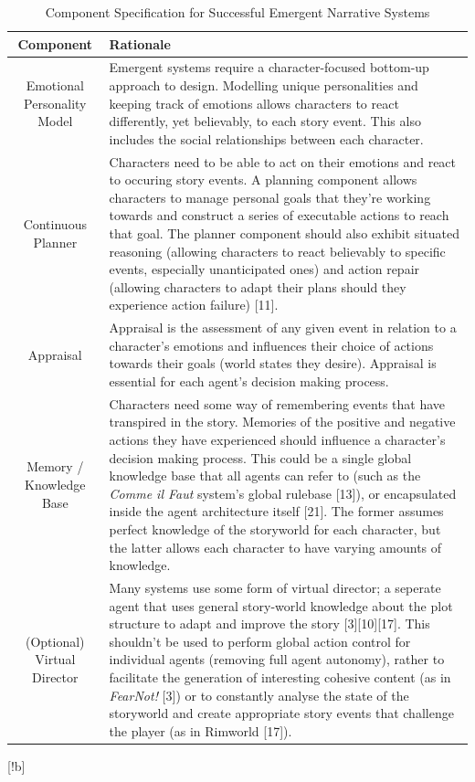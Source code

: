 \documentclass{sig-alternate-05-2015}
\begin{document}
\begin{table}[!b]
\centering
\caption{Component Specification for Successful Emergent Narrative Systems}
    \begin{tabular}{| c | p{13cm} |}
    \hline
    \textbf{Component} & \textbf{Rationale} \\ \hline
    Emotional Personality Model & Emergent systems require a character-focused bottom-up approach to design. Modelling unique personalities and keeping track of emotions allows characters to react differently, yet believably, to each story event. This also includes the social relationships between each character. \\ \hline
    Continuous Planner & Characters need to be able to act on their emotions and react to occuring story events. A planning component allows characters to manage personal goals that they're working towards and construct a series of executable actions to reach that goal. The planner component should also exhibit situated reasoning (allowing characters to react believably to specific events, especially unanticipated ones) and action repair (allowing characters to adapt their plans should they experience action failure) [11]. \\ \hline
    Appraisal & Appraisal is the assessment of any given event in relation to a character's emotions and influences their choice of actions towards their goals (world states they desire). Appraisal is essential for each agent's decision making process. \\ \hline
    Memory / Knowledge Base & Characters need some way of remembering events that have transpired in the story. Memories of the positive and negative actions they have experienced should influence a character's decision making process. This could be a single global knowledge base that all agents can refer to (such as the \textit{Comme il Faut} system's global rulebase [13]), or encapsulated inside the agent architecture itself [21]. The former assumes perfect knowledge of the storyworld for each character, but the latter allows each character to have varying amounts of knowledge. \\ \hline
    (Optional) Virtual Director & Many systems use some form of virtual director; a seperate agent that uses general story-world knowledge about the plot structure to adapt and improve the story [3][10][17]. This shouldn't be used to perform global action control for individual agents (removing full agent autonomy), rather to facilitate the generation of interesting cohesive content (as in \textit{FearNot!} [3]) or to constantly analyse the state of the storyworld and create appropriate story events that challenge the player (as in Rimworld [17]). \\ \hline
    \end{tabular}
\end{table}[!b]
\end{document}

